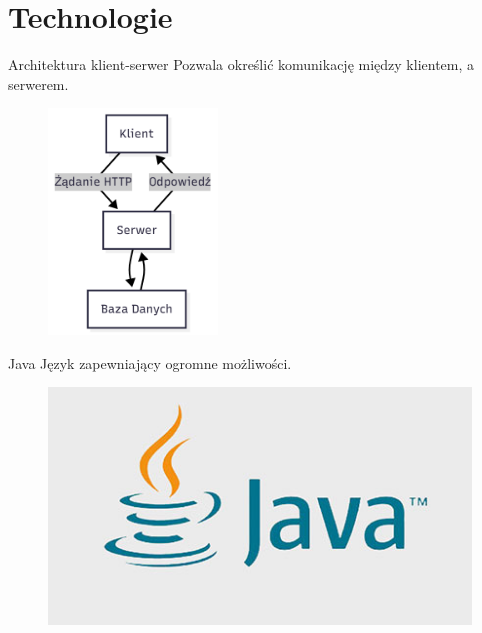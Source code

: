 \section{Technologie}
\begin{frame}{\insertsection}
	\begin{block}{Architektura klient-serwer}
		Pozwala określić komunikację między klientem, a serwerem.
	\end{block}
	\begin{figure}
		\centering
		\includegraphics[height=6cm,width=0.5\linewidth]{../images/Klient-Serwer}
		\label{fig:klient-serwer}
	\end{figure}
\end{frame}

\begin{frame}{\insertsection}
	\begin{block}{Java}
		 Język zapewniający ogromne możliwości.
	\end{block}
\begin{figure}
	\centering
	\includegraphics[width=0.9\linewidth]{../images/javaLogo}
	\label{fig:javalogo}
\end{figure}
\end{frame}

